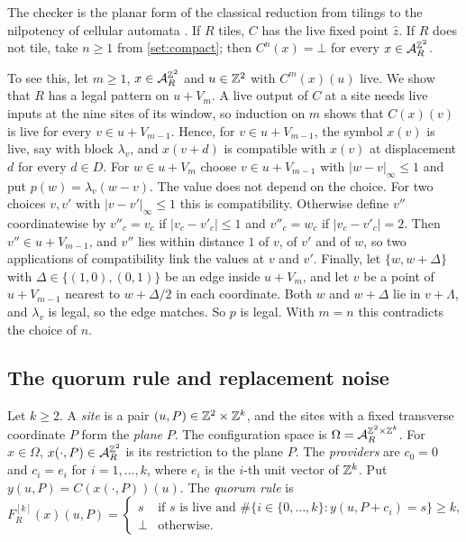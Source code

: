 \begin{remark}\label{set:checker}
The checker is the planar form of the classical reduction from tilings to the nilpotency of cellular automata \cite{CPY89,Kari92}. If $R$ tiles, $C$ has the live fixed point $\hat z$. If $R$ does not tile, take $n\ge1$ from \cref{set:compact}; then $C^n(x)=\bot$ for every $x\in\mathcal{A}_R^{\mathbb{Z}^2}$.

To see this, let $m\ge1$, $x\in\mathcal{A}_R^{\mathbb{Z}^2}$ and $u\in\mathbb{Z}^2$ with $C^m(x)(u)$ live. We show that $R$ has a legal pattern on $u+V_m$. A live output of $C$ at a site needs live inputs at the nine sites of its window, so induction on $m$ shows that $C(x)(v)$ is live for every $v\in u+V_{m-1}$. Hence, for $v\in u+V_{m-1}$, the symbol $x(v)$ is live, say with block $\lambda_v$, and $x(v+d)$ is compatible with $x(v)$ at displacement $d$ for every $d\in D$. For $w\in u+V_m$ choose $v\in u+V_{m-1}$ with $|w-v|_\infty\le1$ and put $p(w)=\lambda_v(w-v)$. The value does not depend on the choice. For two choices $v,v'$ with $|v-v'|_\infty\le1$ this is compatibility. Otherwise define $v''$ coordinatewise by $v''_c=v_c$ if $|v_c-v'_c|\le1$ and $v''_c=w_c$ if $|v_c-v'_c|=2$. Then $v''\in u+V_{m-1}$, and $v''$ lies within distance $1$ of $v$, of $v'$ and of $w$, so two applications of compatibility link the values at $v$ and $v'$. Finally, let $\{w,w+\Delta\}$ with $\Delta\in\{(1,0),(0,1)\}$ be an edge inside $u+V_m$, and let $v$ be a point of $u+V_{m-1}$ nearest to $w+\Delta/2$ in each coordinate. Both $w$ and $w+\Delta$ lie in $v+\Lambda$, and $\lambda_v$ is legal, so the edge matches. So $p$ is legal. With $m=n$ this contradicts the choice of $n$.
\end{remark}

\subsection{The quorum rule and replacement noise}\label{set:sub-pca}

\begin{definition}\label{set:def-quorum}
Let $k\ge2$. A \emph{site} is a pair $(u,P)\in\mathbb{Z}^2\times\mathbb{Z}^k$, and the sites with a fixed transverse coordinate $P$ form the \emph{plane} $P$. The configuration space is $\Omega=\mathcal{A}_R^{\mathbb{Z}^2\times\mathbb{Z}^k}$. For $x\in\Omega$, $x(\cdot,P)\in\mathcal{A}_R^{\mathbb{Z}^2}$ is its restriction to the plane $P$. The \emph{providers} are $c_0=0$ and $c_i=e_i$ for $i=1,\dots,k$, where $e_i$ is the $i$-th unit vector of $\mathbb{Z}^k$. Put $y(u,P)=C(x(\cdot,P))(u)$. The \emph{quorum rule} is
\[
F^{[k]}_R(x)(u,P)=
\begin{cases}
s & \text{if $s$ is live and $\#\{i\in\{0,\dots,k\}:y(u,P+c_i)=s\}\ge k$,}\\
\bot & \text{otherwise.}
\end{cases}
\]
\end{definition}

